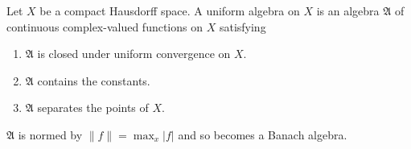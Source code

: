 
Let $X$ be a compact Hausdorff space. A uniform algebra on $X$ is an algebra $\mathfrak{A}$ of continuous complex-valued functions on $X$ satisfying
\begin{enumerate}
\item $\mathfrak{A}$ is closed under uniform convergence on $X$.
\item $\mathfrak{A}$ contains the constants.
\item $\mathfrak{A}$ separates the points of $X$.
\end{enumerate}
$\mathfrak{A}$ is normed by $\|f\| = \max_x |f|$ and so becomes a Banach algebra.
